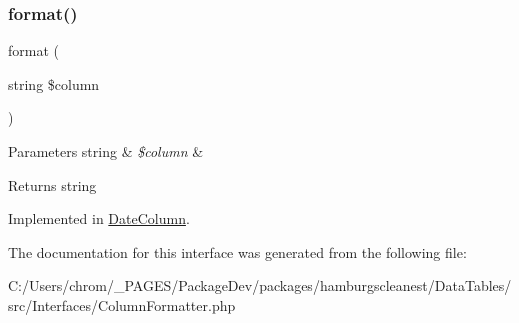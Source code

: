 \subsubsection{\texorpdfstring{format()}{format()}}
{\footnotesize\ttfamily format (\begin{DoxyParamCaption}\item[{string}]{\$column }\end{DoxyParamCaption})}


\begin{DoxyParams}[1]{Parameters}
string & {\em \$column} & \\
\hline
\end{DoxyParams}
\begin{DoxyReturn}{Returns}
string 
\end{DoxyReturn}


Implemented in \hyperlink{classhamburgscleanest_1_1_data_tables_1_1_models_1_1_column_formatters_1_1_date_column_aba259f7ae8b25e70bd444020c04606e7}{Date\+Column}.



The documentation for this interface was generated from the following file\+:\begin{DoxyCompactItemize}
\item 
C\+:/\+Users/chrom/\+\_\+\+P\+A\+G\+E\+S/\+Package\+Dev/packages/hamburgscleanest/\+Data\+Tables/src/\+Interfaces/Column\+Formatter.\+php\end{DoxyCompactItemize}
